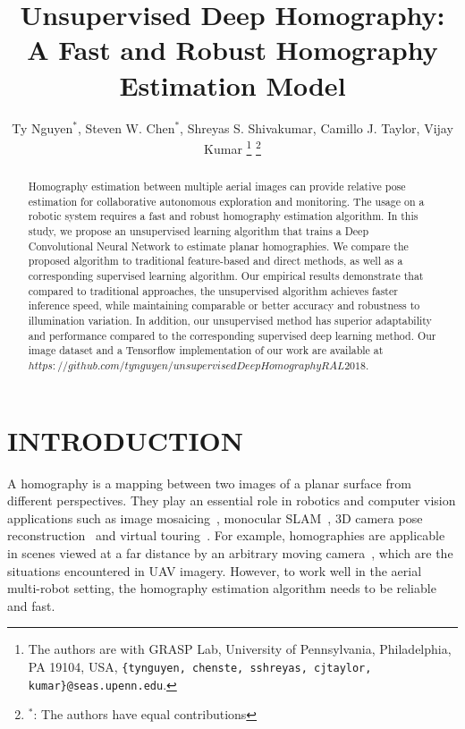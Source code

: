 \documentclass[letterpaper, 10 pt, conference]{ieeeconf}
\begin{document}
\title{Unsupervised Deep Homography: A Fast and Robust Homography Estimation Model}


\author{Ty Nguyen$^*$, Steven W. Chen$^*$, Shreyas S. Shivakumar, Camillo J. Taylor, Vijay Kumar \thanks{The authors are with GRASP Lab, University of Pennsylvania, Philadelphia, PA 19104, USA, {\tt\small\{tynguyen, chenste, sshreyas, cjtaylor, kumar\}@seas.upenn.edu}.}
\thanks{$^*$: The authors have equal contributions}
}





\maketitle


\begin{abstract}
Homography estimation between multiple aerial images can provide relative pose estimation for collaborative autonomous exploration and monitoring. The usage on a robotic system requires a fast and robust homography estimation algorithm. In this study, we propose an unsupervised learning algorithm that trains a Deep Convolutional Neural Network to estimate planar homographies. We compare the proposed algorithm to traditional feature-based and direct methods, as well as a corresponding supervised learning algorithm. Our empirical results demonstrate that compared to traditional approaches, the unsupervised algorithm achieves faster inference speed, while maintaining comparable or better accuracy and robustness to illumination variation. In addition, our unsupervised method has superior adaptability and performance compared to the corresponding supervised deep learning method. Our image dataset and a Tensorflow implementation of our work are available at $https://github.com/tynguyen/unsupervisedDeepHomographyRAL2018$. 
\end{abstract}



\section{INTRODUCTION}
A homography is a mapping between two images of a planar surface from different perspectives. They play an essential role in robotics and computer vision applications such as image mosaicing~\cite{brown2003recognising}, monocular SLAM~\cite{shridhar2015monocular}, 3D camera pose reconstruction~\cite{zhang19963d} and virtual touring~\cite{pan2004easy, tang2007self}. For example, homographies are applicable in scenes viewed at a far distance by an arbitrary moving camera~\cite{capel2004image}, which are the situations encountered in UAV imagery. However, to work well in the aerial multi-robot setting, the homography estimation algorithm needs to be reliable and fast. 
\end{document}
